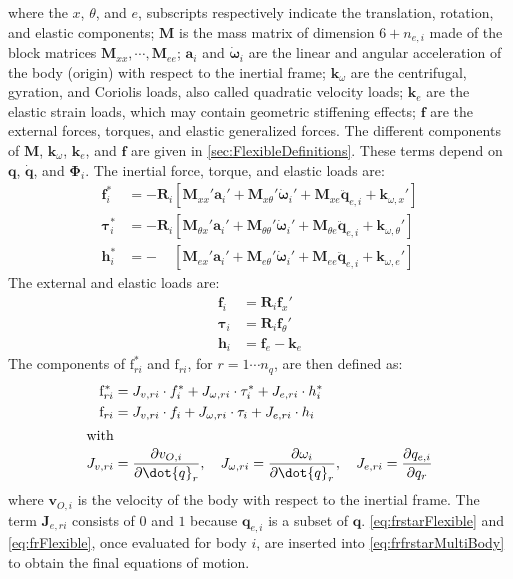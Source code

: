 \documentclass[wes, manuscript]{copernicus}
\renewcommand{\v}[1]{\boldsymbol{#1}}
\newcommand{\m}[1]{\boldsymbol{#1}}
\newcommand{\kanef}{\mathrm{f}}
\begin{document}
where the $x$, $\theta$, and $e$, subscripts respectively indicate the translation, rotation, and elastic components; $\m{M}$ is the mass matrix of dimension $6+n_{e,i}$ made of the block matrices $\m{M}_{xx},\cdots,\m{M}_{ee}$; $\v{a}_i$ and $\v{\dot{\omega}}_i$ are the linear and angular acceleration of the body (origin) with respect to the inertial frame; $\v{k}_\omega$ are the centrifugal, gyration, and Coriolis loads, also called quadratic velocity loads; $\v{k}_e$ are the elastic strain loads, which may contain geometric stiffening effects; $\v{f}$ are the external forces, torques, and elastic generalized forces.
The different components of $\m{M}$, $\m{k}_\omega$,  $\m{k}_e$, and $\v{f}$ are given in \autoref{sec:FlexibleDefinitions}.
These terms depend on $\v{q}$, $\v{\dot{q}}$, and $\v{\Phi}_i$.
% 
The inertial force, torque, and elastic loads are:
\begin{align}
   \v{f}_{i}^* &= -\m{R}_i\left[\m{M}_{xx}'\v{a}_i' + \m{M}_{x\theta}'\v{\dot{\omega}}_i'  + \m{M}_{xe} \v{\ddot{q}}_{e,i}   + \v{k}_{\omega,x}'     \right]\\
   \v{\tau}_{i}^* &= -\m{R}_i\left[\m{M}_{\theta x}'\v{a}_i' + \m{M}_{\theta \theta}'\v{\dot{\omega}}_i'  + \m{M}_{\theta  e} \v{\ddot{q}}_{e,i}   + \v{k}_{\omega,\theta }'     \right]\\
   \v{h}_{i}^* &= - \phantom{\m{R}_i}      \left[\m{M}_{e x}'\v{a}_i' + \m{M}_{e \theta}'\v{\dot{\omega}}_i'  + \m{M}_{e  e} \v{\ddot{q}}_{e,i}   + \v{k}_{\omega,e }'     \right]
\end{align}
The external and elastic loads are:
\begin{align}
   \v{f}_{i} &= \m{R}_i\v{f}_x'\\
   \v{\tau}_{i} &= \m{R}_i\v{f}_\theta'\\
   \v{h}_{i} &=\v{f}_{e} - \v{k}_{e} 
\end{align}
The components of $\kanef_{ri}^*$ and $\kanef_{ri}$, for $r=1\cdots n_q$, are then defined as:
\begin{align}
   \kanef_{ri}^* &= 
       \v{J}_{v,ri} \cdot \v{f}_i^*  + \v{J}_{\omega,ri} \cdot \v{\tau}_i^*
     + \v{J}_{e,ri} \cdot \v{h}_i^*
    \label{eq:frstarFlexible}
     \\
   \kanef_{ri} &= 
       \v{J}_{v,ri} \cdot \v{f}_i  + \v{J}_{\omega,ri} \cdot \v{\tau}_i
     + \v{J}_{e,ri} \cdot \v{h}_i
    \label{eq:frFlexible}
     \\
     \intertext{with}
    \v{J}_{v,ri} &= \frac{\partial \v{v}_{O,i}}{\partial \dot{q}_r}
    ,\quad
    \v{J}_{\omega,ri} = \frac{\partial \v{\omega}_{i}}{\partial \dot{q}_r}
    ,\quad
    \v{J}_{e,ri} = \frac{\partial \v{q}_{e,i}}{\partial q_r}
    \label{eq:Jacobians}
\end{align}
where $\v{v}_{O,i}$ is the velocity of the body with respect to the inertial frame.
The term $\v{J}_{e,ri}$ consists of $0$ and $1$ because $\v{q}_{e,i}$ is a subset of $\v{q}$.
\autoref{eq:frstarFlexible} and \autoref{eq:frFlexible}, once evaluated for body $i$,
are inserted into \autoref{eq:frfrstarMultiBody} to obtain the final equations of motion.
\end{document}
